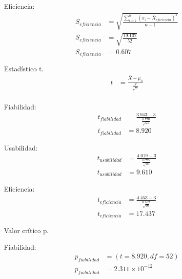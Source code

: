 Eficiencia:
\begin{equation*}
  \begin{split}
    S_{eficiencia} & = \sqrt{\frac{\sum_{i=1}^{n} (x_{i} - \overline{X}_{eficiencia})^2}{n - 1}} \\
    S_{eficiencia} & = \sqrt{\frac{19.132}{52}} \\
    S_{eficiencia} & = 0.607
  \end{split}
\end{equation*}

Estadístico t.
\begin{equation*}
  \begin{split}
    t & = \frac{\overline{X} - \mu_0}{\frac{S}{\sqrt{n}}} \\
  \end{split}
\end{equation*}

Fiabilidad:
\begin{equation*}
  \begin{split}
    t_{fiabilidad} & = \frac{3.943 - 3}{\frac{0.770}{\sqrt{53}}} \\
    t_{fiabilidad} & = 8.920
  \end{split}
\end{equation*}

Usabilidad:
\begin{equation*}
  \begin{split}
    t_{usabilidad} & = \frac{4.019 - 3}{\frac{0.772}{\sqrt{40}}} \\
    t_{usabilidad} & = 9.610
  \end{split}
\end{equation*}

Eficiencia:
\begin{equation*}
  \begin{split}
    t_{eficiencia} & = \frac{4.453 - 3}{\frac{0.607}{\sqrt{66}}} \\
    t_{eficiencia} & = 17.437
  \end{split}
\end{equation*}

Valor crítico p.

Fiabilidad:
\begin{equation*}
  \begin{split}
    p_{fiabilidad} & = (t=8.920, df=52) \\
    p_{fiabilidad} & = 2.311 \times 10^{-12}
  \end{split}
\end{equation*}

